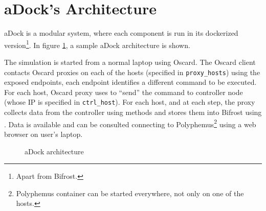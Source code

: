 \section{aDock's Architecture}
\label{sec:adock_arch}
aDock is a modular system, where each component is run in its dockerized version\footnote{Apart from Bifrost.}. In figure \ref{fig:adock_arch}, a sample aDock architecture is shown.

The simulation is started from a normal laptop using Oscard. The Oscard client contacts Oscard proxies on each of the hosts (specified in \texttt{proxy\_hosts}) using the exposed endpoints, each endpoint identifies a different command to be executed. For each host, Oscard proxy uses  to ``send'' the command to controller node (whose IP is specified in \texttt{ctrl\_host}). For each host, and at each step, the proxy collects data from the controller using  methods and stores them into Bifrost using . Data is available and can be consulted connecting to Polyphemus\footnote{Polyphemus container can be started everywhere, not only on one of the hosts.} using a web browser on user's laptop.  

\begin{figure}[H]
\label{fig:adock_arch}
\caption{aDock architecture}
\end{figure}
